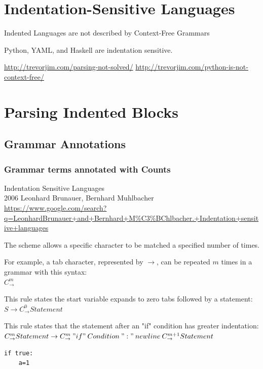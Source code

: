 \documentclass{book}
\begin{document}
\section{Indentation-Sensitive Languages}

Indented Languages are not described by Context-Free Grammars

Python, YAML, and Haskell are indentation sensitive.

\url{http://trevorjim.com/parsing-not-solved/}
\url{http://trevorjim.com/python-is-not-context-free/}

\section{Parsing Indented Blocks}
\subsection{Grammar Annotations}

\subsubsection{Grammar terms annotated with Counts}
Indentation Sensitive Languages\\
2006 Leonhard Brunauer, Bernhard Muhlbacher\\
\url{https://www.google.com/search?q=LeonhardBrunauer+and+Bernhard+M%C3%BChlbacher.+Indentation+sensitive+languages}

The scheme allows a specific character to be matched a specified number of times.

For example, a tab character, represented by $\rightarrow$, can be repeated $m$ 
times in a grammar with this syntax:\\
$C_\rightarrow^m$

This rule states the start variable expands to zero tabs followed by a statement:\\
$S\rightarrow C_\rightarrow^0 Statement$

This rule states that the statement after an
"if" condition has greater indentation:\\
$C_\rightarrow^m Statement \rightarrow C_\rightarrow^m \: "if" \: Condition \: ":" \: newline \: C_\rightarrow^{m+1} Statement$

\begin{verbatim}
if true:
    a=1
\end{verbatim}
\end{document}
